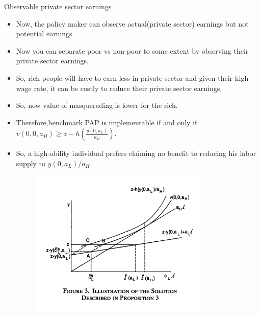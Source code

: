 \documentclass{beamer}
\begin{document}
\begin{frame}[allowframebreaks]{Observable private sector earnings}
\begin{itemize}
    \item Now, the policy maker can observe actual(private sector) earnings but not potential earnings.
    \item Now you can separate poor vs non-poor to some extent by observing their private sector earnings.
    \item So, rich people will have to earn less in private sector and given their high wage rate, it can be costly to reduce their private sector earnings.
    \item So, now value of masquerading is lower for the rich. 
    \item Therefore,benchmark PAP is implementable if and only if $v(0,0,a_H) \geq z-h(\frac{y(0,a_L)}{a_H})$. 
    \item So, a high-ability individual prefers claiming no benefit to reducing his labor supply to $y(0,a_L)/a_H$.

    \begin{figure}
    \includegraphics[width=0.8\textwidth]{F3.png}
    \end{figure}
\end{itemize}

\end{frame}
\end{document}
